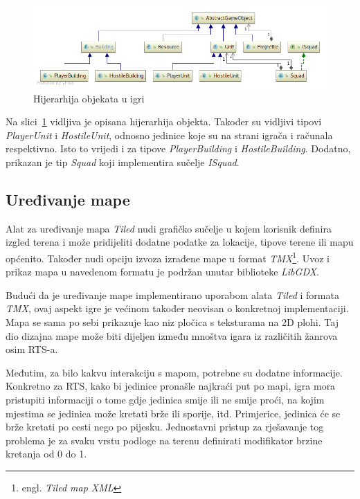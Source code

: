 \documentclass[times, utf8, zavrsni, numeric]{fer}
\begin{document}
\begin{figure}[h]
	\centering
	\includegraphics[width=0.8\linewidth]{images/umlObjects.png}
	\caption{Hijerarhija objekata u igri}
	\label{fig:umlObjects}
\end{figure}

\par Na slici~\ref{fig:umlObjects} vidljiva je opisana hijerarhija objekta.
Također su vidljivi tipovi \textit{PlayerUnit} i \textit{HostileUnit}, odnosno jedinice koje su na strani igrača i računala respektivno.
Isto to vrijedi i za tipove \textit{PlayerBuilding} i \textit{HostileBuilding}.
Dodatno, prikazan je tip \textit{Squad} koji implementira sučelje \textit{ISquad}.

\subsection{Uređivanje mape}

\par Alat za uređivanje mapa \textit{Tiled} nudi grafičko sučelje u kojem korisnik definira izgled terena i može pridijeliti dodatne podatke za lokacije, tipove terene ili mapu općenito.
Također nudi opciju izvoza izrađene mape u format \textit{TMX}\footnote{engl. \textit{Tiled map XML}}.
Uvoz i prikaz mapa u navedenom formatu je podržan unutar biblioteke \textit{LibGDX}.

\par Budući da je uređivanje mape implementirano uporabom alata \textit{Tiled} i formata \textit{TMX}, ovaj aspekt igre je većinom također neovisan o konkretnoj implementaciji.
Mapa se sama po sebi prikazuje kao niz pločica s teksturama na 2D plohi.
Taj dio dizajna mape može biti dijeljen između mnoštva igara iz različitih žanrova osim RTS-a.

\par Međutim, za bilo kakvu interakciju s mapom, potrebne su dodatne informacije.
Konkretno za RTS, kako bi jedinice pronašle najkraći put po mapi, igra mora pristupiti informaciji o tome gdje jedinica smije ili ne smije proći, na kojim mjestima se jedinica može kretati brže ili sporije, itd.
Primjerice, jedinica će se brže kretati po cesti nego po pijesku.
Jednostavni pristup za rješavanje tog problema je za svaku vrstu podloge na  terenu definirati modifikator brzine kretanja od 0 do 1.
\end{document}
